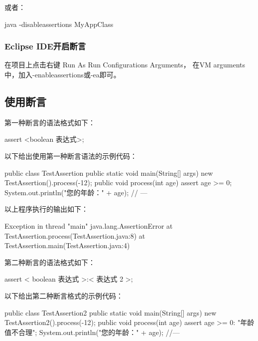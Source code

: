 或者：

\begin{shCode}
java -disableassertions MyAppClass  
\end{shCode}

\subsubsection{Eclipse IDE开启断言}

在项目上点击右键  Run As  Run Configurations  Arguments，
在VM arguments中，加入-enableassertions或-ea即可。

\subsection{使用断言}

第一种断言的语法格式如下：

\begin{javaCode}
assert <boolean 表达式>;  
\end{javaCode}

以下给出使用第一种断言语法的示例代码：


\begin{javaCode}
public class TestAssertion {
  public static void main(String[] args) {
    new TestAssertion().process(-12);
  }
  public void process(int age) {
    assert age >= 0;
    System.out.println("您的年龄：" + age);
    // ---
  }
}
\end{javaCode}

以上程序执行的输出如下：

\begin{stdoutCode}
Exception in thread "main" java.lang.AssertionError
	at TestAssertion.process(TestAssertion.java:8)
	at TestAssertion.main(TestAssertion.java:4)  
\end{stdoutCode}

第二种断言的语法格式如下：

\begin{javaCode}
assert < boolean 表达式 >:< 表达式 2 >;  
\end{javaCode}

以下给出第二种断言格式的示例代码：


\begin{javaCode}
public class TestAssertion2 {
  public static void main(String[] args) {
    new TestAssertion2().process(-12);
  }
  public void process(int age) {
    assert age >= 0: "年龄值不合理";
    System.out.println("您的年龄：" + age);
    //---
  }
}
\end{javaCode}

